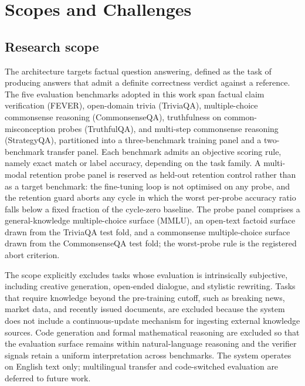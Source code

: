 \section{Scopes and Challenges}

\subsection{Research scope}
\label{sec:scope-research}

The architecture targets factual question answering, defined as the task of producing answers that admit a definite correctness verdict against a reference. The five evaluation benchmarks adopted in this work span factual claim verification (FEVER), open-domain trivia (TriviaQA), multiple-choice commonsense reasoning (CommonsenseQA), truthfulness on common-misconception probes (TruthfulQA), and multi-step commonsense reasoning (StrategyQA), partitioned into a three-benchmark training panel and a two-benchmark transfer panel. Each benchmark admits an objective scoring rule, namely exact match or label accuracy, depending on the task family. A multi-modal retention probe panel is reserved as held-out retention control rather than as a target benchmark: the fine-tuning loop is not optimised on any probe, and the retention guard aborts any cycle in which the worst per-probe accuracy ratio falls below a fixed fraction of the cycle-zero baseline. The probe panel comprises a general-knowledge multiple-choice surface (MMLU), an open-text factoid surface drawn from the TriviaQA test fold, and a commonsense multiple-choice surface drawn from the CommonsenseQA test fold; the worst-probe rule is the registered abort criterion.

The scope explicitly excludes tasks whose evaluation is intrinsically subjective, including creative generation, open-ended dialogue, and stylistic rewriting. Tasks that require knowledge beyond the pre-training cutoff, such as breaking news, market data, and recently issued documents, are excluded because the system does not include a continuous-update mechanism for ingesting external knowledge sources. Code generation and formal mathematical reasoning are excluded so that the evaluation surface remains within natural-language reasoning and the verifier signals retain a uniform interpretation across benchmarks. The system operates on English text only; multilingual transfer and code-switched evaluation are deferred to future work.

